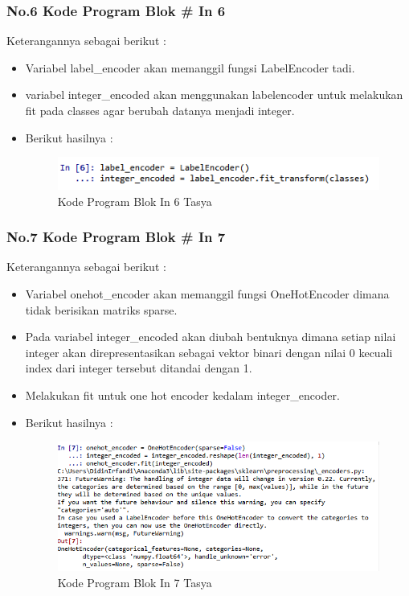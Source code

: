 \subsubsection{No.6 Kode Program Blok \# In 6}

Keterangannya sebagai berikut :\\
\begin{itemize}
\item Variabel label\_encoder akan memanggil fungsi LabelEncoder tadi.
\item variabel integer\_encoded akan menggunakan labelencoder untuk melakukan fit pada classes agar berubah datanya menjadi integer.
\item Berikut hasilnya :
\begin{figure}[ht]
\centering
\includegraphics[scale=0.5]{figures/Chapter 7/1164086/Praktek/chapter7tasya19.png}
\caption{Kode Program Blok In 6 Tasya}
\label{Praktek}
\end{figure}
\end{itemize}

\subsubsection{No.7 Kode Program Blok \# In 7}

Keterangannya sebagai berikut :\\
\begin{itemize}
\item Variabel onehot\_encoder akan memanggil fungsi OneHotEncoder dimana tidak berisikan matriks sparse.
\item Pada variabel integer\_encoded akan diubah bentuknya dimana setiap nilai integer akan direpresentasikan sebagai vektor binari dengan nilai 0 kecuali index dari integer tersebut ditandai dengan 1.
\item Melakukan fit untuk one hot encoder kedalam integer\_encoder.
\item Berikut hasilnya :\\
\begin{figure}[ht]
\centering
\includegraphics[scale=0.5]{figures/Chapter 7/1164086/Praktek/chapter7tasya20.png}
\caption{Kode Program Blok In 7 Tasya}
\label{Praktek}
\end{figure}
\end{itemize}

